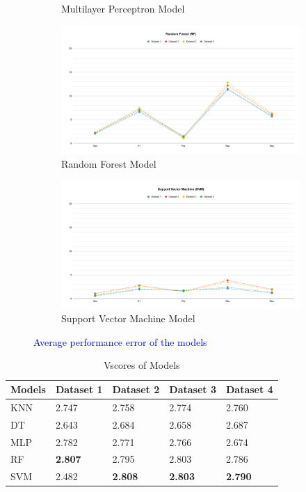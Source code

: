 \documentclass[a4paper,fleqn]{cas-dc}
\newcommand{\rowstyle}[1]{\gdef\currentrowstyle{#1}#1\ignorespaces}  %
\newcommand{\bfrow}{\rowstyle{\bfseries}}  %
\newcommand{\responsemodsm}[1]{\textcolor{blue}{#1}}
\begin{document}
\begin{figure}[H]
\begin{subfigure}{\columnwidth}
        \caption{Multilayer Perceptron Model}\label{fig:performance_delta_mlp}
    \end{subfigure}
    \begin{subfigure}{\columnwidth}
        \includegraphics[width=0.9\columnwidth]{delta_RF.pdf}
        \caption{Random Forest Model}\label{fig:performance_delta_rf}
    \end{subfigure}
    \begin{subfigure}{\columnwidth}
        \includegraphics[width=0.9\columnwidth]{delta_SVM.pdf}
        \caption{Support Vector Machine Model}\label{fig:performance_delta_svm}
    \end{subfigure}
    \caption{\responsemodsm{Average performance error of the models}}\label{fig:average_error}
\end{figure}

\clearpage
\begin{table}[H]
    \caption{Vscores of Models}\label{tab:vscores_models}
    \begin{tabular*}{\tblwidth}{@{}FKKKK@{}}
        \toprule
        \bfrow Models & Dataset 1 & Dataset 2 & Dataset 3 & Dataset 4 \\
        \midrule
        KNN & 2.747 & 2.758 & 2.774 & 2.760 \\
        DT & 2.643 & 2.684 & 2.658 & 2.687 \\
        MLP & 2.782 & 2.771 & 2.766 & 2.674 \\
        RF & \textbf{2.807} & 2.795 & 2.803 & 2.786 \\
        SVM & 2.482 & \textbf{2.808} & \textbf{2.803} & \textbf{2.790} \\
        \bottomrule
    \end{tabular*}
\end{table}
\end{document}
